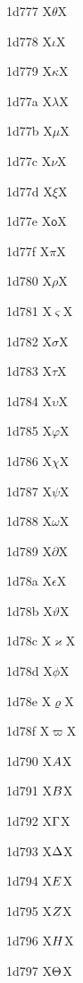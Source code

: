 \documentclass[11pt]{article}
\begin{document}
1d777 X{\ensuremath{\mathsf{\theta}}}X

1d778 X{\ensuremath{\mathsf{\iota}}}X

1d779 X{\ensuremath{\mathsf{\kappa}}}X

1d77a X{\ensuremath{\mathsf{\lambda}}}X

1d77b X{\ensuremath{\mathsf{\mu}}}X

1d77c X{\ensuremath{\mathsf{\nu}}}X

1d77d X{\ensuremath{\mathsf{\xi}}}X

1d77e X{\ensuremath{\mathsf{o}}}X

1d77f X{\ensuremath{\mathsf{\pi}}}X

1d780 X{\ensuremath{\mathsf{\rho}}}X

1d781 X{\ensuremath{\mathsf{\varsigma}}}X

1d782 X{\ensuremath{\mathsf{\sigma}}}X

1d783 X{\ensuremath{\mathsf{\tau}}}X

1d784 X{\ensuremath{\mathsf{\upsilon}}}X

1d785 X{\ensuremath{\mathsf{\varphi}}}X

1d786 X{\ensuremath{\mathsf{\chi}}}X

1d787 X{\ensuremath{\mathsf{\psi}}}X

1d788 X{\ensuremath{\mathsf{\omega}}}X

1d789 X{\ensuremath{\mathsf{\partial}}}X

1d78a X{\ensuremath{\mathsf{\epsilon}}}X

1d78b X{\ensuremath{\mathsf{\vartheta}}}X

1d78c X{\ensuremath{\mathsf{\varkappa}}}X

1d78d X{\ensuremath{\mathsf{\phi}}}X

1d78e X{\ensuremath{\mathsf{\varrho}}}X

1d78f X{\ensuremath{\mathsf{\varpi}}}X

1d790 X{\ensuremath{\mathsfbfsl{A}}}X

1d791 X{\ensuremath{\mathsfbfsl{B}}}X

1d792 X{\ensuremath{\mathsfbfsl{\Gamma}}}X

1d793 X{\ensuremath{\mathsfbfsl{\Delta}}}X

1d794 X{\ensuremath{\mathsfbfsl{E}}}X

1d795 X{\ensuremath{\mathsfbfsl{Z}}}X

1d796 X{\ensuremath{\mathsfbfsl{H}}}X

1d797 X{\ensuremath{\mathsfbfsl{\Theta}}}X
\end{document}
